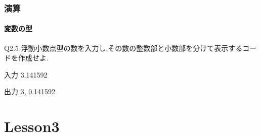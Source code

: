 \documentclass[dvipdfmx]{beamer}
\begin{document}
\begin{frame}
    \frametitle{演算}
    \framesubtitle{変数の型}
	\begin{itembox}[l]{Q2.5}
        浮動小数点型の数を入力し,その数の整数部と小数部を分けて表示するコードを作成せよ.
	\end{itembox}
	\begin{block}{入力}
        3.141592
	\end{block}
	\begin{block}{出力}
        3, 0.141592
	\end{block}
\end{frame}

\section{Lesson3}
%
\end{document}
